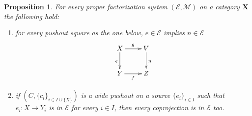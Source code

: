 \documentclass[a4paper]{article}
\def\X{\textbf {\textup{X}}}
\newtheorem{proposition}[theorem]{Proposition}
\theoremstyle{definition}
\begin{document}
\begin{proposition} \label{prop:mp} For every proper factorization system $(\mathcal{E}, \mathcal{M})$ on a category $\X$ the following hold:
	\begin{enumerate}
		\item  for every pushout square as the one below,  $e\in \mathcal{E}$ implies $n\in \mathcal{E}$ 
		\[\xymatrix{X\ar[r]^{g} \ar[d]_{e} & V \ar[d]^{n} \\ Y \ar[r]_{f}  & Z}\] 
		\item  if $(C, \{c_i\}_{i\in I\cup \{X\}})$ is a wide pushout on a source $\{e_i\}_{i\in I}$ such that $e_i\colon X\to Y_i$ is in $\mathcal{E}$ for every $i\in I$, then every coprojection is in $\mathcal{E}$ too. 
	\end{enumerate}
\end{proposition}
\end{document}
